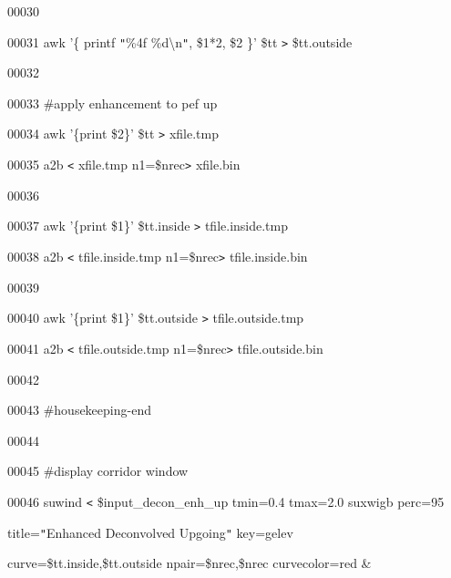 \documentclass{article}
\begin{document}
\vspace{4pt}
00030 

\vspace{4pt}
00031 awk '\{ printf \texttt{"}\%4f \%d\textbackslash{}n\texttt{"}, \$1*2, \$2 
\}' \$tt \texttt{>} \$tt.outside

\vspace{4pt}
00032 

\vspace{4pt}
00033 \#apply enhancement to pef up

\vspace{4pt}
00034 awk '\{print \$2\}' \$tt \texttt{>} xfile.tmp

\vspace{4pt}
00035 a2b \texttt{<} xfile.tmp n1=\$nrec\texttt{>} xfile.bin

\vspace{4pt}
00036 

\vspace{4pt}
00037 awk '\{print \$1\}' \$tt.inside \texttt{>} tfile.inside.tmp

\vspace{4pt}
00038 a2b \texttt{<} tfile.inside.tmp n1=\$nrec\texttt{>} tfile.inside.bin

\vspace{4pt}
00039 

\vspace{4pt}
00040 awk '\{print \$1\}' \$tt.outside \texttt{>} tfile.outside.tmp

\vspace{4pt}
00041 a2b \texttt{<} tfile.outside.tmp n1=\$nrec\texttt{>} tfile.outside.bin

\vspace{4pt}
00042 

\vspace{4pt}
00043 \#housekeeping-end

\vspace{4pt}
00044 

\vspace{4pt}
00045 \#display corridor window

\vspace{4pt}
00046 suwind \texttt{<} \$input\_decon\_enh\_up tmin=0.4 tmax=2.0 \textbar{} suxwigb 
perc=95 

\vspace{4pt}
\parindent=18pt
title=\texttt{"}Enhanced Deconvolved Upgoing\texttt{"}  key=gelev 

\vspace{4pt}
curve=\$tt.inside,\$tt.outside npair=\$nrec,\$nrec curvecolor=red \&
\end{document}
